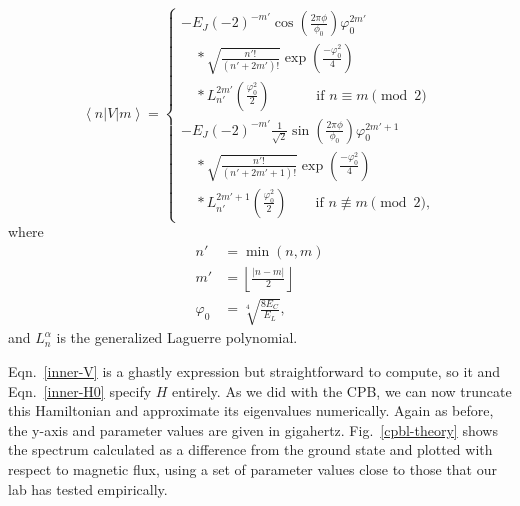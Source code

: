 \documentclass[twocolumn]{revtex4}
\newcommand{\innerp}[3]{\textstyle\left< #1 \left| #2 \right| #3 \right>}
\begin{document}
\begin{equation}
  \innerp{n}{V}{m} = \left\{\begin{array}{l}
      -E_J(-2)^{-m'}\cos\left(\frac{2\pi\phi}{\phi_0}\right)\varphi_0^{2m'}\\
      \quad{}*\sqrt{\frac{n'!}{(n'+2m')!}}
      \exp\left(\frac{-\varphi_0^2}{4}\right)\\
      \quad{}*L_{n'}^{2m'}\left(\frac{\varphi_0^2}{2}\right)
      \phantom{{}^{{}+1}}\qquad \text{if $n \equiv m \pmod{2}$}\\
      -E_J(-2)^{-m'}\frac{1}{\sqrt{2}}\sin
      \left(\frac{2\pi\phi}{\phi_0}\right)\varphi_0^{2m'+1}\\
      \quad{}*\sqrt{\frac{n'!}{(n'+2m'+1)!}}
      \exp\left(\frac{-\varphi_0^2}{4}\right)\\
      \quad{}*L_{n'}^{2m'+1}\left(\frac{\varphi_0^2}{2}\right)
      \qquad\text{if $n \not\equiv m \pmod{2}$},
\end{array}\right.
\label{inner-V}
\end{equation}
where
\begin{align}
  n'& =\min(n,m)\\
  m'&=\left\lfloor\frac{|n-m|}{2}\right\rfloor \\
  \varphi_0 &=\sqrt[4]{\frac{8E_C}{E_L}},
\end{align}
and $L_n^\alpha$ is the generalized Laguerre polynomial.

Eqn.~\eqref{inner-V} is a ghastly expression but straightforward to
compute, so it and Eqn.~\eqref{inner-H0} specify $H$ entirely. As we did
with the CPB, we can now truncate this Hamiltonian and approximate its
eigenvalues numerically. Again as before, the y-axis and parameter
values are given in gigahertz. Fig.~\ref{cpbl-theory} shows the
spectrum calculated as a difference from the ground state and plotted
with respect to magnetic flux, using a set of parameter values close
to those that our lab has tested empirically.
\end{document}
